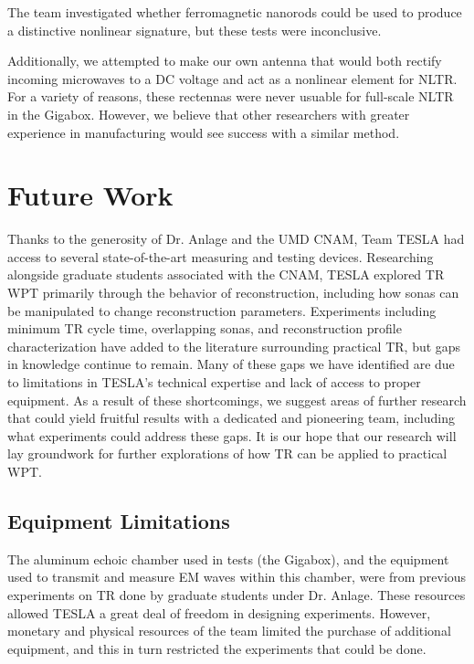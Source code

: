 The team investigated whether ferromagnetic nanorods could be used to produce a distinctive nonlinear signature, but these tests were inconclusive. 

Additionally, we attempted to make our own antenna that would both rectify incoming microwaves to a DC voltage and act as a nonlinear element for NLTR. For a variety of reasons, these rectennas were never usuable for full-scale NLTR in the Gigabox. However, we believe that other researchers with greater experience in manufacturing would see success with a similar method.

\section{Future Work}

Thanks to the generosity of Dr. Anlage and the UMD CNAM, Team TESLA had access to several state-of-the-art measuring and testing devices. Researching alongside graduate students associated with the CNAM, TESLA explored TR WPT primarily through the behavior of reconstruction, including how sonas can be manipulated to change reconstruction parameters.  Experiments including minimum TR cycle time, overlapping sonas, and reconstruction profile characterization have added to the literature surrounding practical TR, but gaps in knowledge continue to remain.  Many of these gaps we have identified are due to limitations in TESLA's technical expertise and lack of  access to proper equipment.  As a result of these shortcomings, we suggest areas of further research that could yield fruitful results with a dedicated and pioneering team, including what experiments could address these gaps.  It is our hope that our research will lay groundwork for further explorations of how TR can be applied to practical WPT.

\subsection{Equipment Limitations}

The aluminum echoic chamber used in tests (the Gigabox), and the equipment used to transmit and measure EM waves within this chamber, were from previous experiments on TR done by graduate students under Dr. Anlage.  These resources allowed TESLA a great deal of freedom in designing experiments.  However, monetary and physical resources of the team limited the purchase of additional equipment, and this in turn restricted the experiments that could be done.

